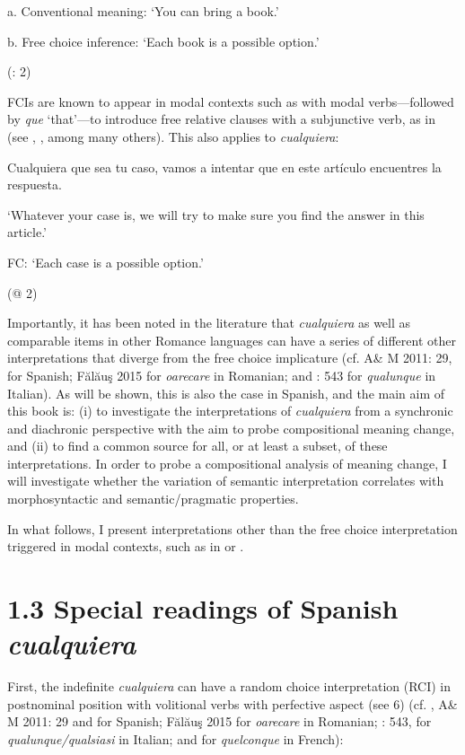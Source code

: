     a.  Conventional meaning: ‘You can bring a book.’

    b.  Free choice inference: ‘Each book is a possible option.’

      (\citealt{AloniEtAl2011}: 2)

FCIs are known to appear in modal contexts such as with modal verbs—followed by \textit{que} ‘that’—to introduce free relative clauses with a subjunctive verb, as in  (see \citealt{Quer2000}, \citealt{Giannakidou2001}, among many others). This also applies to \textit{cualquiera}:

    Cualquiera que sea tu caso, vamos a intentar que en este artículo encuentres la respuesta.

    ‘Whatever your case is, we will try to make sure you find the answer in this article.’

    FC: ‘Each case is a possible option.’  

      (@ 2)

Importantly, it has been noted in the literature that \textit{cualquiera} as well as comparable items in other Romance languages can have a series of different other interpretations that diverge from the free choice implicature (cf. A\& M 2011: 29, \citealt{Rivero2011} for Spanish; Fălăuş 2015 for \textit{oarecare} in Romanian; and \citealt{Chierchia2006}: 543 for \textit{qualunque} in Italian). As will be shown, this is also the case in Spanish, and the main aim of this book is: (i) to investigate the interpretations of \textit{cualquiera} from a synchronic and diachronic perspective with the aim to probe compositional meaning change, and (ii) to find a common source for all, or at least a subset, of these interpretations. In order to probe a compositional analysis of meaning change, I will investigate whether the variation of semantic interpretation correlates with morphosyntactic and semantic/pragmatic properties.

  In what follows, I present interpretations other than the free choice interpretation triggered in modal contexts, such as in  or .

\section{1.3 Special readings of Spanish \textit{cualquiera}}

First, the indefinite \textit{cualquiera} can have a random choice interpretation (RCI) in postnominal position with volitional verbs with perfective aspect (see 6) (cf. \citealt{ChoiRomero2008}, A\& M 2011: 29 and \citealt{Rivero2011} for Spanish; Fălăuş 2015 for \textit{oarecare} in Romanian; \citealt{Chierchia2006}: 543, \citealt{Kellert2021} for \textit{qualunque/qualsiasi} in Italian; and \citealt{Vlachou2007,Vlachou2012} for \textit{quelconque} in French):

